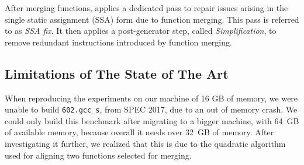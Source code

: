 After merging functions, \SOAName applies a dedicated pass to repair issues arising in the single static assignment (SSA) form due to function merging. This pass is referred to as \emph{SSA fix}. It then applies a post-generator step, called \emph{Simplification}, to remove redundant instructions introduced by function merging. 



\subsection{Limitations of The State of The Art}


When reproducing the experiments  on our machine of 16 GB of memory, we were unable to build \texttt{602.gcc\_s}, from SPEC 2017, due to an out of memory crash.
We could only build this benchmark after migrating to a bigger machine, with 64~GB of available memory, because overall it needs over 32~GB of memory.
After investigating it further, we realized that this is due to the quadratic algorithm used for aligning two functions selected for merging.

